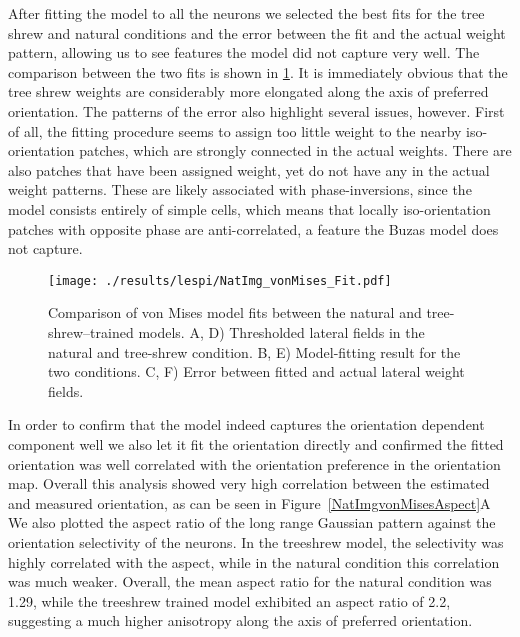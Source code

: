 After fitting the model to all the neurons we selected the best fits
for the tree shrew and natural conditions and the error between the
fit and the actual weight pattern, allowing us to see features the
model did not capture very well. The comparison between the two fits
is shown in \ref{NatImgvonMises}. It is immediately obvious that the
tree shrew weights are considerably more elongated along the axis of
preferred orientation. The patterns of the error also highlight
several issues, however.  First of all, the fitting procedure seems to
assign too little weight to the nearby iso-orientation patches, which
are strongly connected in the actual weights. There are also patches
that have been assigned weight, yet do not have any in the actual
weight patterns. These are likely associated with phase-inversions,
since the model consists entirely of simple cells, which means that
locally iso-orientation patches with opposite phase are
anti-correlated, a feature the Buzas model does not capture.

\begin{figure}
	\centering
        \texttt{[image: ./results/lespi/NatImg\_vonMises\_Fit.pdf]}
	\caption[Comparison of \cite{Buzas2006} von Mises model fit between
      the natural and treeshrew trained models.]{Comparison of
      \cite{Buzas2006} von Mises model fits between the natural and
      tree-shrew--trained models. A, D) Thresholded lateral fields in
      the natural and tree-shrew condition. B, E) Model-fitting result
      for the two conditions. C, F) Error between fitted and actual
      lateral weight fields.}
	\label{NatImgvonMises}
\end{figure}

In order to confirm that the model indeed captures the orientation
dependent component well we also let it fit the orientation directly
and confirmed the fitted orientation was well correlated with the
orientation preference in the orientation map. Overall this analysis
showed very high correlation between the estimated and measured
orientation, as can be seen in Figure~\ref{NatImgvonMisesAspect}A We
also plotted the aspect ratio of the long range Gaussian pattern
against the orientation selectivity of the neurons. In the treeshrew
model, the selectivity was highly correlated with the aspect, while in
the natural condition this correlation was much weaker. Overall, the
mean aspect ratio for the natural condition was 1.29, while the
treeshrew trained model exhibited an aspect ratio of 2.2, suggesting a
much higher anisotropy along the axis of preferred orientation.

